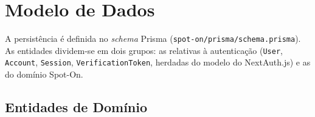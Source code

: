 \documentclass[11pt,a4paper]{article}
\begin{document}
\section{Modelo de Dados}\label{sec:data}

A persistência é definida no \emph{schema} Prisma
(\texttt{spot-on/prisma/schema.prisma}). As entidades dividem-se em dois
grupos: as relativas à autenticação (\texttt{User}, \texttt{Account},
\texttt{Session}, \texttt{VerificationToken}, herdadas do modelo do
NextAuth.js) e as do domínio Spot-On.

\subsection{Entidades de Domínio}
\end{document}

